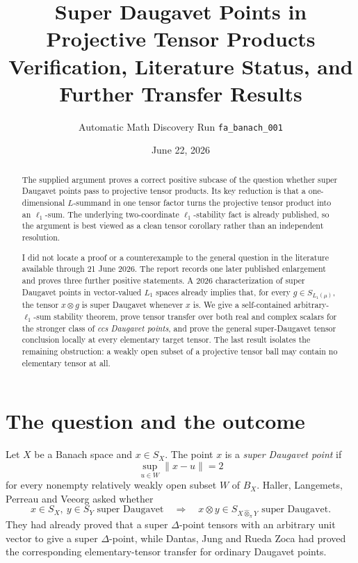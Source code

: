 \documentclass[11pt]{article}
\title{Super Daugavet Points in Projective Tensor Products\\
\large Verification, Literature Status, and Further Transfer Results}
\author{Automatic Math Discovery Run \texttt{fa\_banach\_001}}
\date{June 22, 2026}
\theoremstyle{definition}
\newcommand{\whotpi}{\widehat{\otimes}_{\pi}}
\begin{document}
\maketitle

\begin{abstract}
The supplied argument proves a correct positive subcase of the question whether
super Daugavet points pass to projective tensor products.  Its key reduction is
that a one-dimensional $L$-summand in one tensor factor turns the projective
tensor product into an $\ell_1$-sum.  The underlying two-coordinate
$\ell_1$-stability fact is already published, so the argument is best viewed as
a clean tensor corollary rather than an independent resolution.

I did not locate a proof or a counterexample to the general question in the
literature available through 21 June 2026.  The report records one later
published enlargement and proves three further positive statements.  A 2026
characterization of super Daugavet points in vector-valued $L_1$ spaces already
implies that, for every $g\in S_{L_1(\mu)}$, the tensor $x\otimes g$ is super
Daugavet whenever $x$ is.  We give a self-contained arbitrary-$\ell_1$-sum
stability theorem, prove tensor transfer over both real and complex scalars for
the stronger class of \emph{ccs Daugavet points}, and prove the general
super-Daugavet tensor conclusion locally at every elementary target tensor.
The last result isolates the remaining obstruction: a weakly open subset of a
projective tensor ball may contain no elementary tensor at all.
\end{abstract}

\section{The question and the outcome}

Let $X$ be a Banach space and $x\in S_X$.  The point $x$ is a
\emph{super Daugavet point} if
\[
  \sup_{u\in W}\|x-u\|=2
\]
for every nonempty relatively weakly open subset $W$ of $B_X$.
Haller, Langemets, Perreau and Veeorg asked whether
\begin{equation}\label{eq:main-question}
  x\in S_X,\ y\in S_Y\text{ super Daugavet}
  \quad\Longrightarrow\quad
  x\otimes y\in S_{X\whotpi Y}\text{ super Daugavet}.
\end{equation}
They had already proved that a super $\Delta$-point tensors with an arbitrary
unit vector to give a super $\Delta$-point, while Dantas, Jung and Rueda Zoca
had proved the corresponding elementary-tensor transfer for ordinary
Daugavet points.
\end{document}
